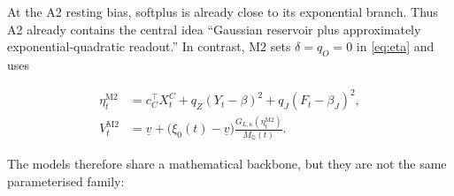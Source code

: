 \documentclass[11pt,a4paper]{article}
\newcommand{\Qq}{\mathbb{Q}}
\begin{document}
At the A2 resting bias, softplus is already close to its exponential branch. Thus A2 already
contains the central idea ``Gaussian reservoir plus approximately exponential-quadratic
readout.'' In contrast, M2 sets \(\delta=q_O=0\) in \cref{eq:eta} and uses

\begin{align}
\eta_t^{\mathrm{M2}}
  &=c_C^\top X_t^C+q_Z(Y_t-\beta)^2+q_J(F_t-\beta_J)^2,
\label{eq:m2-readout-comparison}\\
V_t^{\mathrm{M2}}
  &=\underline v+\bigl(\xi_0(t)-\underline v\bigr)
    \frac{G_{L,\kappa}(\eta_t^{\mathrm{M2}})}{M_{\Qq}(t)}.
\label{eq:m2-variance-comparison}
\end{align}

The models therefore share a mathematical backbone, but they are not the same parameterised
family:
\end{document}
